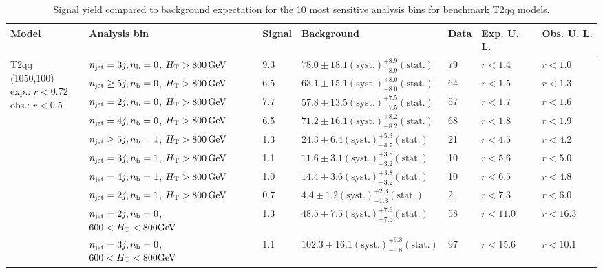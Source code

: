 \begin{table}[h!] 
  \scriptsize
  \caption{ 
Signal yield compared to background expectation for the 10 most sensitive analysis bins 
for benchmark T2qq models.
  \label{tab:sigBenchmarksYields_T2qq}}
  \centering 
  \begin{tabular}{ lllllll } 
    \hline 
    \hline 
    Model & Analysis bin & Signal & Background & Data & Exp. U. L. & Obs. U. L. \\ \hline
\multirow{10}{*}{\parbox[t]{2cm}{T2qq (1050,100)\\exp.: $r<0.72$\\obs.: $r<0.5$}}
 & $n_{\mathrm{jet}} =3j,n_{\text{b}} =0$, $\mbox{$H_\text{T}$} > 800 \, \mathrm{GeV}$ & 9.3 & $78.0 \pm 18.1 \mathrm{(syst.)} ^{+8.9}_{-8.9} \mathrm{(stat.)}$ & 79 & $r < 1.4$ & $r < 1.0$\\ 
 & $n_{\mathrm{jet}} \geq5j,n_{\text{b}} =0$, $\mbox{$H_\text{T}$} > 800 \, \mathrm{GeV}$ & 6.5 & $63.1 \pm 15.1 \mathrm{(syst.)} ^{+8.0}_{-8.0} \mathrm{(stat.)}$ & 64 & $r < 1.5$ & $r < 1.3$\\ 
 & $n_{\mathrm{jet}} =2j,n_{\text{b}} =0$, $\mbox{$H_\text{T}$} > 800 \, \mathrm{GeV}$ & 7.7 & $57.8 \pm 13.5 \mathrm{(syst.)} ^{+7.5}_{-7.5} \mathrm{(stat.)}$ & 57 & $r < 1.7$ & $r < 1.6$\\ 
 & $n_{\mathrm{jet}} =4j,n_{\text{b}} =0$, $\mbox{$H_\text{T}$} > 800 \, \mathrm{GeV}$ & 6.5 & $71.2 \pm 16.1 \mathrm{(syst.)} ^{+8.2}_{-8.2} \mathrm{(stat.)}$ & 68 & $r < 1.8$ & $r < 1.9$\\ 
 & $n_{\mathrm{jet}} \geq5j,n_{\text{b}} =1$, $\mbox{$H_\text{T}$} > 800 \, \mathrm{GeV}$ & 1.3 & $24.3 \pm 6.4 \mathrm{(syst.)} ^{+5.3}_{-4.7} \mathrm{(stat.)}$ & 21 & $r < 4.5$ & $r < 4.2$\\ 
 & $n_{\mathrm{jet}} =3j,n_{\text{b}} =1$, $\mbox{$H_\text{T}$} > 800 \, \mathrm{GeV}$ & 1.1 & $11.6 \pm 3.1 \mathrm{(syst.)} ^{+3.8}_{-3.2} \mathrm{(stat.)}$ & 10 & $r < 5.6$ & $r < 5.0$\\ 
 & $n_{\mathrm{jet}} =4j,n_{\text{b}} =1$, $\mbox{$H_\text{T}$} > 800 \, \mathrm{GeV}$ & 1.0 & $14.4 \pm 3.6 \mathrm{(syst.)} ^{+3.8}_{-3.2} \mathrm{(stat.)}$ & 10 & $r < 6.5$ & $r < 4.8$\\ 
 & $n_{\mathrm{jet}} =2j,n_{\text{b}} =1$, $\mbox{$H_\text{T}$} > 800 \, \mathrm{GeV}$ & 0.7 & $4.4 \pm 1.2 \mathrm{(syst.)} ^{+2.3}_{-1.3} \mathrm{(stat.)}$ & 2 & $r < 7.3$ & $r < 6.0$\\ 
 & $n_{\mathrm{jet}} =2j,n_{\text{b}} =0$, $600 < \mbox{$H_\text{T}$} < 800 \mathrm{GeV}$ & 1.3 & $48.5 \pm 7.5 \mathrm{(syst.)} ^{+7.6}_{-7.6} \mathrm{(stat.)}$ & 58 & $r < 11.0$ & $r < 16.3$\\ 
 & $n_{\mathrm{jet}} =3j,n_{\text{b}} =0$, $600 < \mbox{$H_\text{T}$} < 800 \mathrm{GeV}$ & 1.1 & $102.3 \pm 16.1 \mathrm{(syst.)} ^{+9.8}_{-9.8} \mathrm{(stat.)}$ & 97 & $r < 15.6$ & $r < 10.1$\\ \hline

\end{tabular}
\end{table}
